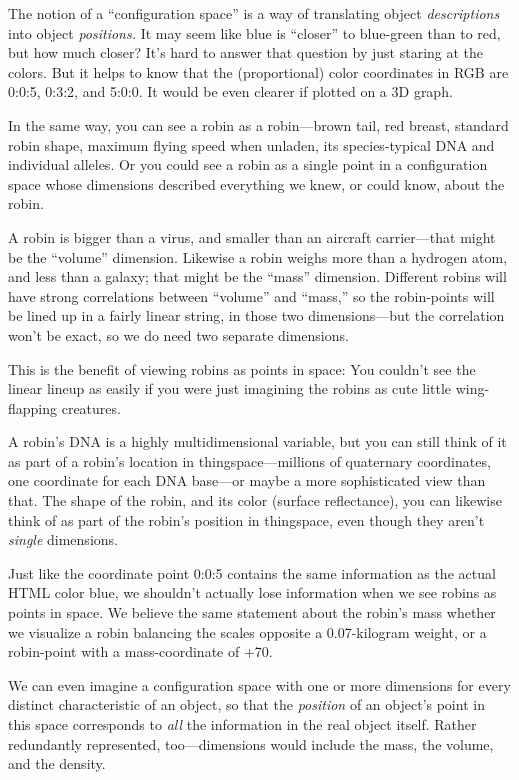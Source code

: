 
{
 The notion of a ``configuration
space'' is a way of translating object
\textit{descriptions} into object \textit{positions.} It may seem like
blue is ``closer'' to blue-green
than to red, but how much closer? It's hard to answer
that question by just staring at the colors. But it helps to know that
the (proportional) color coordinates in RGB are 0:0:5, 0:3:2, and
5:0:0. It would be even clearer if plotted on a 3D graph.}

{
 In the same way, you can see a robin as a robin---brown tail, red
breast, standard robin shape, maximum flying speed when unladen, its
species-typical DNA and individual alleles. Or you could see a robin as
a single point in a configuration space whose dimensions described
everything we knew, or could know, about the robin.}

{
 A robin is bigger than a virus, and smaller than an aircraft
carrier---that might be the
``volume'' dimension. Likewise a
robin weighs more than a hydrogen atom, and less than a galaxy; that
might be the ``mass'' dimension.
Different robins will have strong correlations between
``volume'' and
``mass,'' so the robin-points will
be lined up in a fairly linear string, in those two dimensions---but
the correlation won't be exact, so we do need two
separate dimensions.}

{
 This is the benefit of viewing robins as points in space: You
couldn't see the linear lineup as easily if you were
just imagining the robins as cute little wing-flapping creatures.}

{
 A robin's DNA is a highly multidimensional
variable, but you can still think of it as part of a
robin's location in thingspace---millions of quaternary
coordinates, one coordinate for each DNA base---or maybe a more
sophisticated view than that. The shape of the robin, and its color
(surface reflectance), you can likewise think of as part of the
robin's position in thingspace, even though they
aren't \textit{single} dimensions.}

{
 Just like the coordinate point 0:0:5 contains the same information
as the actual HTML color blue, we shouldn't actually
lose information when we see robins as points in space. We believe the
same statement about the robin's mass whether we
visualize a robin balancing the scales opposite a 0.07-kilogram weight,
or a robin-point with a mass-coordinate of +70.}

{
 We can even imagine a configuration space with one or more
dimensions for every distinct characteristic of an object, so that the
\textit{position} of an object's point in this space
corresponds to \textit{all} the information in the real object itself.
Rather redundantly represented, too---dimensions would include the
mass, the volume, and the density.}

